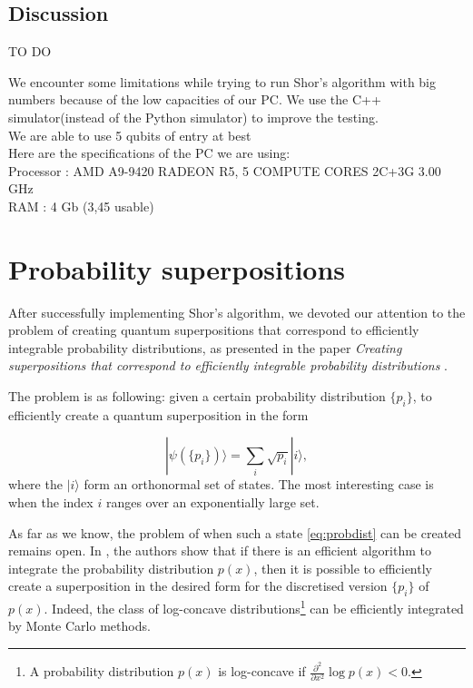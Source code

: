\documentclass[a4paper, 10pt]{article}
\numberwithin{equation}{section}
\numberwithin{figure}{section}
\numberwithin{table}{section}
\begin{document}
\subsection{Discussion}
{\color{red} TO DO}

We encounter some limitations while trying to run Shor's algorithm with big numbers because of the low capacities of our PC. We use the C++ simulator(instead of the Python simulator) to improve the testing.\\
We are able to use 5 qubits of entry at best\\
Here are the specifications of the PC we are using:\\
Processor : AMD A9-9420 RADEON R5, 5 COMPUTE CORES 2C+3G 3.00 GHz\\
RAM : 4 Gb (3,45 usable)



\clearpage
\newpage
\section{Probability superpositions}

After successfully implementing Shor's algorithm, we devoted our attention to the problem of creating quantum superpositions that correspond to efficiently integrable probability distributions, as presented in the paper \textit{Creating superpositions that correspond to efficiently integrable probability distributions} \cite{grover}.

The problem is as following: given a certain probability distribution $\{p_i\}$, to efficiently create a quantum superposition in the form

\begin{equation} \label{eq:probdist}
|\psi(\{p_i\})\rangle = \sum_i \sqrt{p_i}|i\rangle,
\end{equation}
where the $|i\rangle$ form an orthonormal set of states. The most interesting case is when the index $i$ ranges over an exponentially large set.

As far as we know, the problem of when such a state \ref{eq:probdist} can be created remains open. In \cite{grover}, the authors show that if there is an efficient algorithm to integrate the probability distribution $p(x)$, then it is possible to efficiently create a superposition in the desired form for the discretised version $\{p_i\}$ of $p(x)$. Indeed, the class of log-concave distributions\footnote{A probability distribution $p(x)$ is log-concave if $\frac{\partial^2}{\partial x^2}\log p(x) < 0$.} can be efficiently integrated by Monte Carlo methods.
\end{document}
